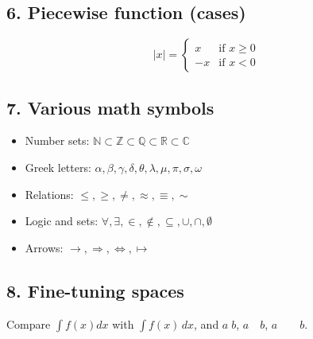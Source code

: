 \documentclass[12pt]{article}
\begin{document}
\subsection*{6. Piecewise function (cases)}
\[
|x| = \begin{cases}
x & \text{if } x \geq 0 \\
-x & \text{if } x < 0
\end{cases}
\]

\subsection*{7. Various math symbols}
\begin{itemize}
  \item Number sets: $\mathbb{N} \subset \mathbb{Z} \subset \mathbb{Q} \subset \mathbb{R} \subset \mathbb{C}$
  \item Greek letters: $\alpha, \beta, \gamma, \delta, \theta, \lambda, \mu, \pi, \sigma, \omega$
  \item Relations: $\leq, \geq, \neq, \approx, \equiv, \sim$
  \item Logic and sets: $\forall, \exists, \in, \notin, \subseteq, \cup, \cap, \emptyset$
  \item Arrows: $\rightarrow, \Rightarrow, \Leftrightarrow, \mapsto$
\end{itemize}

\subsection*{8. Fine-tuning spaces}
Compare $\int f(x)dx$ with $\int f(x)\,dx$, and $a\;b$, $a\quad b$, $a\qquad b$.
\end{document}
